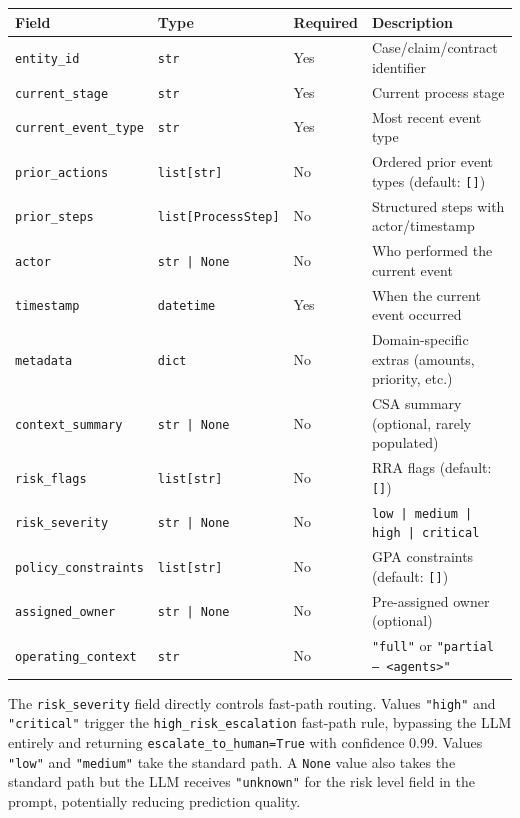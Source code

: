 \documentclass[12pt,a4paper]{article}
\begin{document}
\begin{longtable}{@{}p{3.8cm}p{3.2cm}p{1.5cm}p{5.5cm}@{}}
\toprule
\textbf{Field} & \textbf{Type} & \textbf{Required} & \textbf{Description} \\
\midrule
\endhead
\texttt{entity\_id} & \texttt{str} & Yes & Case/claim/contract identifier \\
\texttt{current\_stage} & \texttt{str} & Yes & Current process stage \\
\texttt{current\_event\_type} & \texttt{str} & Yes & Most recent event type \\
\texttt{prior\_actions} & \texttt{list[str]} & No & Ordered prior event types (default: \texttt{[]}) \\
\texttt{prior\_steps} & \texttt{list[ProcessStep]} & No & Structured steps with actor/timestamp \\
\texttt{actor} & \texttt{str | None} & No & Who performed the current event \\
\texttt{timestamp} & \texttt{datetime} & Yes & When the current event occurred \\
\texttt{metadata} & \texttt{dict} & No & Domain-specific extras (amounts, priority, etc.) \\
\texttt{context\_summary} & \texttt{str | None} & No & CSA summary (optional, rarely populated) \\
\texttt{risk\_flags} & \texttt{list[str]} & No & RRA flags (default: \texttt{[]}) \\
\texttt{risk\_severity} & \texttt{str | None} & No & \texttt{low | medium | high | critical} \\
\texttt{policy\_constraints} & \texttt{list[str]} & No & GPA constraints (default: \texttt{[]}) \\
\texttt{assigned\_owner} & \texttt{str | None} & No & Pre-assigned owner (optional) \\
\texttt{operating\_context} & \texttt{str} & No & \texttt{"full"} or \texttt{"partial --- <agents>"} \\
\bottomrule
\end{longtable}

The \texttt{risk\_severity} field directly controls fast-path routing. Values
\texttt{"high"} and \texttt{"critical"} trigger the \texttt{high\_risk\_escalation}
fast-path rule, bypassing the LLM entirely and returning
\texttt{escalate\_to\_human=True} with confidence 0.99. Values \texttt{"low"} and
\texttt{"medium"} take the standard path. A \texttt{None} value also takes the
standard path but the LLM receives \texttt{"unknown"} for the risk level field in
the prompt, potentially reducing prediction quality.
\end{document}
